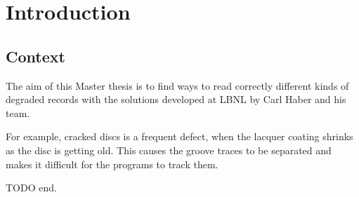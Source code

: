 
\chapter{Introduction}

\section{Context}

The aim of this Master thesis is to find ways to read correctly different kinds of degraded records with the solutions developed at LBNL by Carl Haber and his team.

For example, cracked discs is a frequent defect, when the lacquer coating shrinks as the disc is getting old. This causes the groove traces to be separated and makes it difficult for the programs to track them.

TODO end.





%
%
%
%

%

%

